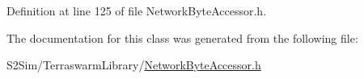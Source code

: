 Definition at line 125 of file Network\-Byte\-Accessor.\-h.



The documentation for this class was generated from the following file\-:\begin{DoxyCompactItemize}
\item 
S2\-Sim/\-Terraswarm\-Library/\hyperlink{_network_byte_accessor_8h}{Network\-Byte\-Accessor.\-h}\end{DoxyCompactItemize}
